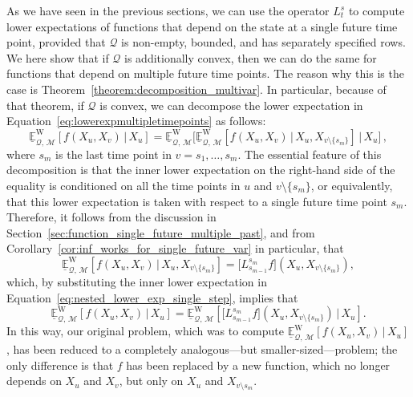 \documentclass[10pt,a4paper]{paper}
\theoremstyle{definition}
\newcommand{\rateset}{\mathcal{Q}}
\begin{document}
As we have seen in the previous sections, we can use the operator $L_t^s$ to compute lower expectations of functions that depend on the state at a single future time point, provided that $\rateset$ is non-empty, bounded, and has separately specified rows. We here show that if $\rateset$ is additionally convex, then we can do the same for functions that depend on multiple future time points. 
The reason why this is the case is Theorem~\ref{theorem:decomposition_multivar}. In particular, because of that theorem, if $\rateset$ is convex, we can decompose the lower expectation in Equation~\eqref{eq:lowerexpmultipletimepoints} as follows:
\begin{equation}\label{eq:nested_lower_exp_single_step}
\underline{\mathbb{E}}_{\rateset,\,\mathcal{M}}^{\mathrm{W}}[f(X_u,X_v)\,\vert\,X_u] = \underline{\mathbb{E}}_{\rateset,\,\mathcal{M}}^{\mathrm{W}}\bigl[ \underline{\mathbb{E}}_{\rateset,\,\mathcal{M}}^{\mathrm{W}}[f(X_u,X_v)\,\vert\,X_u,X_{v\setminus\{s_m\}}] \,\big\vert\,X_u\bigr]\,,
\end{equation}
where $s_m$ is the last time point in $v=s_1,\dots,s_m$. The essential feature of this decomposition is that the inner lower expectation on the right-hand side of the equality is conditioned on all the time points in $u$ and $v\setminus\{s_m\}$, or equivalently, that this lower expectation is taken with respect to a single future time point $s_m$. Therefore, it follows from the discussion in Section~\ref{sec:function_single_future_multiple_past}, and from Corollary~\ref{cor:inf_works_for_single_future_var} in particular, that
\begin{equation*}
\underline{\mathbb{E}}_{\rateset,\,\mathcal{M}}^{\mathrm{W}}[f(X_u,X_v)\,\vert\,X_u,X_{v\setminus\{s_m\}}]=\big[L_{s_{m-1}}^{s_m}f\big]\left(X_u,X_{v\setminus\{s_m\}}\right),
\end{equation*}
which, by substituting the inner lower expectation in Equation~\eqref{eq:nested_lower_exp_single_step}, implies that
\begin{equation*}
\underline{\mathbb{E}}_{\rateset,\,\mathcal{M}}^{\mathrm{W}}[f(X_u,X_v)\,\vert\,X_u] = \underline{\mathbb{E}}_{\rateset,\,\mathcal{M}}^{\mathrm{W}}\left[ \big[L_{s_{m-1}}^{s_m}f\big]\left(X_u,X_{v\setminus\{s_m\}}\right) \,\big\vert\,X_u\right].
\end{equation*}
In this way, our original problem, which was to compute $\underline{\mathbb{E}}_{\rateset,\,\mathcal{M}}^{\mathrm{W}}[f(X_u,X_v)\,\vert\,X_u]$, has been reduced to a completely analogous---but smaller-sized---problem; the only difference is that $f$ has been replaced by a new function, which no longer depends on $X_u$ and $X_{v}$, but only on $X_u$ and $X_{v\setminus s_m}$.
\end{document}
